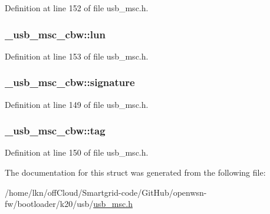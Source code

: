 Definition at line 152 of file usb\+\_\+msc.\+h.

\subsubsection[{\texorpdfstring{lun}{lun}}]{ \+\_\+usb\+\_\+msc\+\_\+cbw\+::lun}\hypertarget{struct__usb__msc__cbw_a3b28bfb7235c101cf2ffe15b2b99bd5d}{}\label{struct__usb__msc__cbw_a3b28bfb7235c101cf2ffe15b2b99bd5d}


Definition at line 153 of file usb\+\_\+msc.\+h.

\subsubsection[{\texorpdfstring{signature}{signature}}]{ \+\_\+usb\+\_\+msc\+\_\+cbw\+::signature}\hypertarget{struct__usb__msc__cbw_ac7b913ab1dc1457f782bf30fb455fa73}{}\label{struct__usb__msc__cbw_ac7b913ab1dc1457f782bf30fb455fa73}


Definition at line 149 of file usb\+\_\+msc.\+h.

\subsubsection[{\texorpdfstring{tag}{tag}}]{ \+\_\+usb\+\_\+msc\+\_\+cbw\+::tag}\hypertarget{struct__usb__msc__cbw_a859c6eac69d5008a1d0d2a043fcc8c47}{}\label{struct__usb__msc__cbw_a859c6eac69d5008a1d0d2a043fcc8c47}


Definition at line 150 of file usb\+\_\+msc.\+h.



The documentation for this struct was generated from the following file\+:\begin{DoxyCompactItemize}
\item 
/home/lkn/off\+Cloud/\+Smartgrid-\/code/\+Git\+Hub/openwsn-\/fw/bootloader/k20/usb/\hyperlink{usb__msc_8h}{usb\+\_\+msc.\+h}\end{DoxyCompactItemize}
